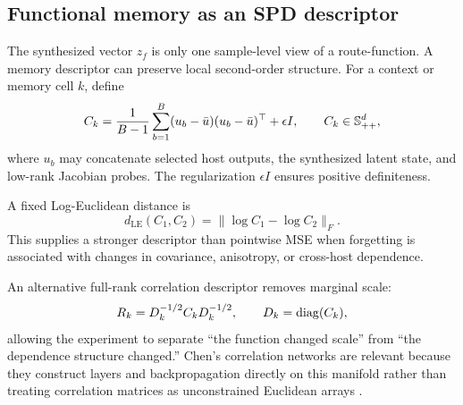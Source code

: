 \subsection{Functional memory as an SPD descriptor}
The synthesized vector $z_f$ is only one sample-level view of a route-function. A memory descriptor can preserve local second-order structure. For a context or memory cell $k$, define
\begin{equation}
  C_k
  = \frac{1}{B-1}\sum_{b=1}^{B}
    (u_b-\bar u)(u_b-\bar u)^\top + \epsilon I,
  \qquad C_k\in\mathbb{S}_{++}^{d},
  \label{eq:spd-memory}
\end{equation}
where $u_b$ may concatenate selected host outputs, the synthesized latent state, and low-rank Jacobian probes. The regularization $\epsilon I$ ensures positive definiteness.

A fixed Log-Euclidean distance is
\begin{equation}
  d_{\mathrm{LE}}(C_1,C_2)
  = \|\log C_1-\log C_2\|_F.
  \label{eq:le-distance}
\end{equation}
This supplies a stronger descriptor than pointwise MSE when forgetting is associated with changes in covariance, anisotropy, or cross-host dependence.

An alternative full-rank correlation descriptor removes marginal scale:
\begin{equation}
  R_k = D_k^{-1/2} C_k D_k^{-1/2},
  \qquad D_k=\operatorname{diag}(C_k),
  \label{eq:corr-memory}
\end{equation}
allowing the experiment to separate ``the function changed scale'' from ``the dependence structure changed.'' Chen's correlation networks are relevant because they construct layers and backpropagation directly on this manifold rather than treating correlation matrices as unconstrained Euclidean arrays \citep{chen2026cornet,chen2026thesis}.

